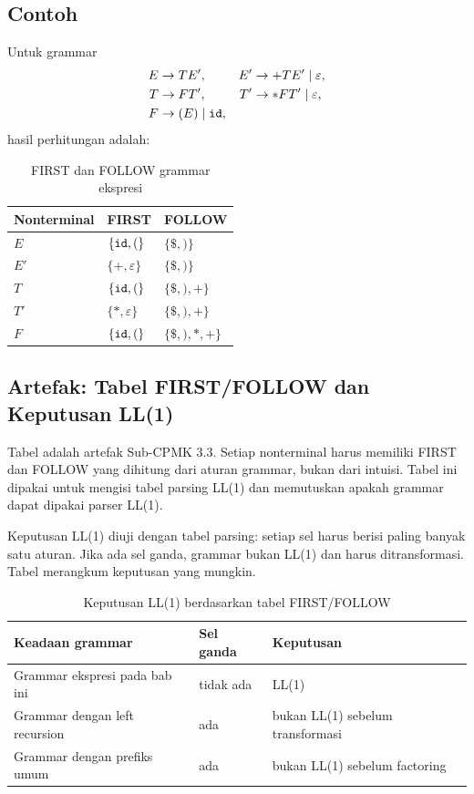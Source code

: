 \subsection{Contoh}

Untuk grammar
\[
\begin{aligned}
E &\to T E', &
E' &\to + T E' \mid \varepsilon,\\
T &\to F T', &
T' &\to * F T' \mid \varepsilon,\\
F &\to (E) \mid \texttt{id},
\end{aligned}
\]
hasil perhitungan adalah:
\begin{table}[H]
\centering
\caption{FIRST dan FOLLOW grammar ekspresi}
\label{tab:ch10-first-follow}
\begin{tabular}{@{}l l l@{}}
\toprule
\textbf{Nonterminal} & \textbf{FIRST} & \textbf{FOLLOW} \\
\midrule
\(E\)  & \(\{ \texttt{id}, ( \}\) & \(\{ \$, ) \}\) \\
\(E'\) & \(\{ +, \varepsilon \}\) & \(\{ \$, ) \}\) \\
\(T\)  & \(\{ \texttt{id}, ( \}\) & \(\{ \$, ), + \}\) \\
\(T'\) & \(\{ *, \varepsilon \}\) & \(\{ \$, ), + \}\) \\
\(F\)  & \(\{ \texttt{id}, ( \}\) & \(\{ \$, ), *, + \}\) \\
\bottomrule
\end{tabular}
\end{table}

\subsection{Artefak: Tabel FIRST/FOLLOW dan Keputusan LL(1)}

Tabel  adalah artefak Sub-CPMK 3.3.
Setiap nonterminal harus memiliki FIRST dan FOLLOW yang dihitung dari
aturan grammar, bukan dari intuisi. Tabel ini dipakai untuk mengisi
tabel parsing LL(1) dan memutuskan apakah grammar dapat dipakai
parser LL(1).

Keputusan LL(1) diuji dengan tabel parsing: setiap sel harus berisi
paling banyak satu aturan. Jika ada sel ganda, grammar bukan LL(1)
dan harus ditransformasi. Tabel 
merangkum keputusan yang mungkin.

\begin{table}[H]
\centering
\caption{Keputusan LL(1) berdasarkan tabel FIRST/FOLLOW}
\label{tab:ch10-keputusan}
\begin{tabularx}{\textwidth}{@{}l l X@{}}
\toprule
\textbf{Keadaan grammar} & \textbf{Sel ganda} & \textbf{Keputusan} \\
\midrule
Grammar ekspresi pada bab ini & tidak ada & LL(1) \\
Grammar dengan left recursion & ada & bukan LL(1) sebelum
transformasi \\
Grammar dengan prefiks umum & ada & bukan LL(1) sebelum factoring \\
\bottomrule
\end{tabularx}
\end{table}

